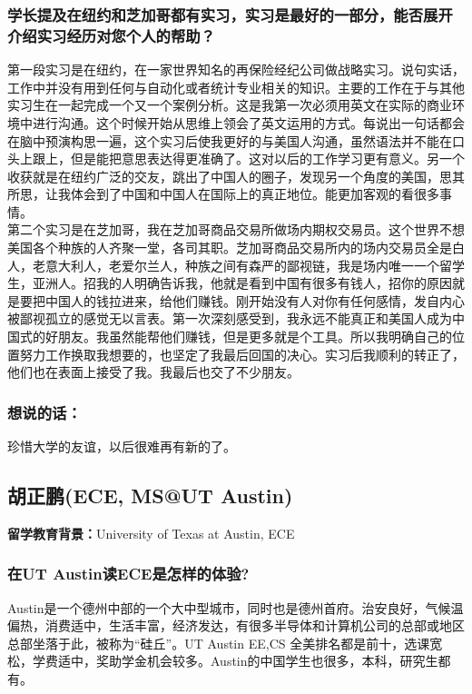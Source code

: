 \documentclass[a4paper,UTF8]{book}
\begin{document}
    \subsubsection*{学长提及在纽约和芝加哥都有实习，实习是最好的一部分，能否展开介绍实习经历对您个人的帮助？}
    第一段实习是在纽约，在一家世界知名的再保险经纪公司做战略实习。说句实话，工作中并没有用到任何与自动化或者统计专业相关的知识。主要的工作在于与其他实习生在一起完成一个又一个案例分析。这是我第一次必须用英文在实际的商业环境中进行沟通。这个时候开始从思维上领会了英文运用的方式。每说出一句话都会在脑中预演构思一遍，这个实习后使我更好的与美国人沟通，虽然语法并不能在口头上跟上，但是能把意思表达得更准确了。这对以后的工作学习更有意义。另一个收获就是在纽约广泛的交友，跳出了中国人的圈子，发现另一个角度的美国，思其所思，让我体会到了中国和中国人在国际上的真正地位。能更加客观的看很多事情。\\
    第二个实习是在芝加哥，我在芝加哥商品交易所做场内期权交易员。这个世界不想美国各个种族的人齐聚一堂，各司其职。芝加哥商品交易所内的场内交易员全是白人，老意大利人，老爱尔兰人，种族之间有森严的鄙视链，我是场内唯一一个留学生，亚洲人。招我的人明确告诉我，他就是看到中国有很多有钱人，招你的原因就是要把中国人的钱拉进来，给他们赚钱。刚开始没有人对你有任何感情，发自内心被鄙视孤立的感觉无以言表。第一次深刻感受到，我永远不能真正和美国人成为中国式的好朋友。我虽然能帮他们赚钱，但是更多就是个工具。所以我明确自己的位置努力工作换取我想要的，也坚定了我最后回国的决心。实习后我顺利的转正了，他们也在表面上接受了我。我最后也交了不少朋友。

    \subsubsection{想说的话：}
    珍惜大学的友谊，以后很难再有新的了。



\clearpage
\subsection{胡正鹏(ECE, MS@UT Austin)}
    \textbf{留学教育背景：}University of Texas at Austin, ECE

    \subsubsection*{在UT Austin读ECE是怎样的体验?}
    Austin是一个德州中部的一个大中型城市，同时也是德州首府。治安良好，气候温偏热，消费适中，生活丰富，经济发达，有很多半导体和计算机公司的总部或地区总部坐落于此，被称为“硅丘”。UT Austin EE,CS 全美排名都是前十，选课宽松，学费适中，奖助学金机会较多。Austin的中国学生也很多，本科，研究生都有。
\end{document}
